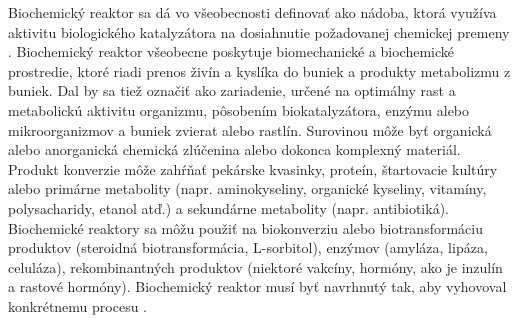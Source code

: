 Biochemický reaktor sa dá vo všeobecnosti definovať ako nádoba, ktorá využíva aktivitu biologického katalyzátora na dosiahnutie požadovanej chemickej premeny \cite{ref1}.
Biochemický reaktor všeobecne poskytuje biomechanické a biochemické prostredie, ktoré riadi prenos živín a kyslíka do buniek a produkty metabolizmu z buniek. Dal by sa tiež označiť ako zariadenie, určené na optimálny rast a metabolickú aktivitu organizmu, pôsobením biokatalyzátora, enzýmu alebo mikroorganizmov a buniek zvierat alebo rastlín. Surovinou môže byť organická alebo anorganická chemická zlúčenina alebo dokonca komplexný materiál. Produkt konverzie môže zahŕňať pekárske kvasinky, proteín, štartovacie kultúry alebo primárne metabolity (napr. aminokyseliny, organické kyseliny, vitamíny, polysacharidy, etanol atď.) a sekundárne metabolity (napr. antibiotiká). Biochemické reaktory sa môžu použiť na biokonverziu alebo biotransformáciu produktov (steroidná biotransformácia, L-sorbitol), enzýmov (amyláza, lipáza, celuláza), rekombinantných produktov (niektoré vakcíny, hormóny, ako je inzulín a rastové hormóny). Biochemický reaktor musí byť navrhnutý tak, aby vyhovoval konkrétnemu procesu \cite{ref1}.

